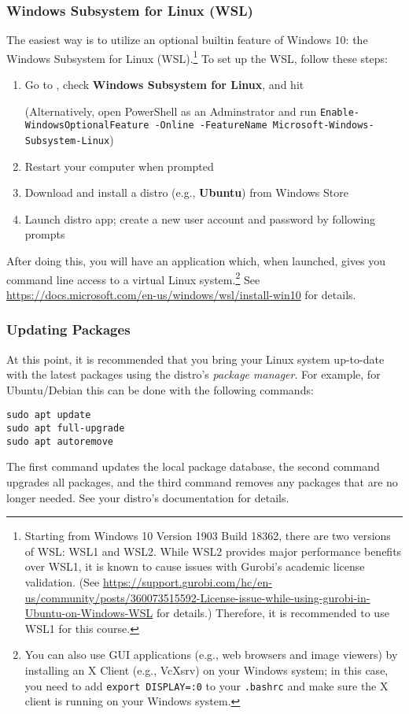 \documentclass[12pt]{article}
\begin{document}
\subsubsection{Windows Subsystem for Linux (WSL)} \label{sec:wsl}
The easiest way is to utilize an optional builtin feature of Windows 10: the Windows Subsystem for Linux (WSL).\footnote{
    Starting from Windows 10 Version 1903 Build 18362, there are two versions of WSL: WSL1 and WSL2.
    While WSL2 provides major performance benefits over WSL1, it is known to cause issues with Gurobi's academic license validation.
    (See \url{https://support.gurobi.com/hc/en-us/community/posts/360073515592-License-issue-while-using-gurobi-in-Ubuntu-on-Windows-WSL} for details.)
    Therefore, it is recommended to use WSL1 for this course.
}
To set up the WSL, follow these steps:
\begin{enumerate}
    \item Go to , check \textbf{Windows Subsystem for Linux}, and hit 

        (Alternatively, open PowerShell as an Adminstrator and run \texttt{Enable-WindowsOptionalFeature -Online -FeatureName Microsoft-Windows-Subsystem-Linux})
    \item Restart your computer when prompted
    \item Download and install a distro (e.g., \textbf{Ubuntu}) from Windows Store
    \item Launch distro app; create a new user account and password by following prompts
\end{enumerate}
After doing this, you will have an application which, when launched, gives you command line access to a virtual Linux system.\footnote{
    You can also use GUI applications (e.g., web browsers and image viewers) by installing an X Client (e.g., VcXsrv) on your Windows system; in this case, you need to add \texttt{export DISPLAY=:0} to your \texttt{.bashrc} and make sure the X client is running on your Windows system.
}
See \url{https://docs.microsoft.com/en-us/windows/wsl/install-win10} for details.

\subsubsection{Updating Packages}
At this point, it is recommended that you bring your Linux system up-to-date with the latest packages using the distro's \emph{package manager}.
For example, for Ubuntu/Debian this can be done with the following commands:
\begin{verbatim}
sudo apt update
sudo apt full-upgrade
sudo apt autoremove
\end{verbatim}
The first command updates the local package database, the second command upgrades all packages, and the third command removes any packages that are no longer needed.
See your distro's documentation for details.
\end{document}
